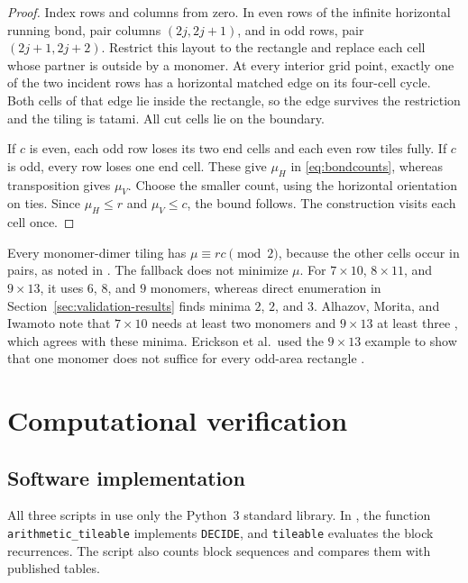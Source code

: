 \documentclass[11pt, reqno]{amsart}
\theoremstyle{definition}
\theoremstyle{remark}
\numberwithin{equation}{section}
\begin{document}
\begin{proof}
    Index rows and columns from zero. In even rows of the infinite
    horizontal running bond, pair columns $(2j,2j+1)$, and in odd rows,
    pair $(2j+1,2j+2)$. Restrict this layout to the rectangle and
    replace each cell whose partner is outside by a monomer.
    At every interior grid point, exactly one of the two incident
    rows has a horizontal matched edge on its four-cell cycle.
    Both cells of that edge lie inside the rectangle, so the edge survives
    the restriction and the tiling is tatami. All cut cells lie on the boundary.

    If $c$ is even, each odd row loses its two end cells and each
    even row tiles fully. If $c$ is odd, every row loses one end cell.
    These give $\mu_H$ in \eqref{eq:bondcounts}, whereas transposition gives
    $\mu_V$. Choose the smaller count, using the horizontal orientation
    on ties. Since $\mu_H\le r$ and $\mu_V\le c$, the bound follows.
    The construction visits each cell once.
\end{proof}

Every monomer-dimer tiling has $\mu\equiv rc\pmod2$,
because the other cells occur in pairs, as noted in
\cite[Theorem~1]{erws11}. The fallback does not minimize $\mu$.
For $7\times10$, $8\times11$, and $9\times13$, it uses $6$, $8$,
and $9$ monomers, whereas direct enumeration in Section~\ref{sec:validation-results} finds
minima $2$, $2$, and $3$. Alhazov, Morita, and Iwamoto note that
$7\times10$ needs at least two monomers and $9\times13$ at least
three \cite[Section~8]{ami10}, which agrees with these minima.
Erickson et al.\ used the $9\times13$ example to show that one monomer
does not suffice for every odd-area rectangle \cite{erws11}.

\section{Computational verification}
\label{sec:computational-verification}

\subsection{Software implementation}
\label{sec:implementation}

{
    All three scripts in \mbox{} use only the Python~3
    standard library. In , the function
    \texttt{arithmetic\_tileable} implements \texttt{DECIDE}, and
    \texttt{tileable} evaluates the block recurrences. The script also
    counts block sequences and compares them with published tables.\par}
\end{document}
